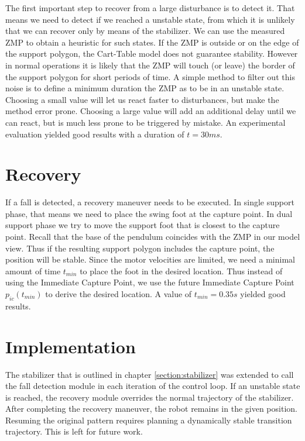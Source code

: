 \documentclass[english,ngerman]{KITreprt}
\begin{document}
The first important step to recover from a large disturbance is to
detect it. That means we need to detect if we reached a unstable state,
from which it is unlikely that we can recover only by means of the
stabilizer. We can use the measured ZMP to obtain a heuristic for such
states. If the ZMP is outside or on the edge of the support polygon, the
Cart-Table model does not guarantee stability. However in normal
operations it is likely that the ZMP will touch (or leave) the border of
the support polygon for short periods of time. A simple method to filter
out this noise is to define a minimum duration the ZMP as to be in an
unstable state. Choosing a small value will let us react faster to
disturbances, but make the method error prone. Choosing a large value
will add an additional delay until we can react, but is much less prone
to be triggered by mistake. An experimental evaluation yielded good
results with a duration of $t = 30ms$.

\section{Recovery}\label{recovery}

If a fall is detected, a recovery maneuver needs to be executed. In
single support phase, that means we need to place the swing foot at the
capture point. In dual support phase we try to move the support foot
that is closest to the capture point. Recall that the base of the
pendulum coincides with the ZMP in our model view. Thus if the resulting
support polygon includes the capture point, the position will be stable.
Since the motor velocities are limited, we need a minimal amount of time
$t_{min}$ to place the foot in the desired location. Thus instead of
using the Immediate Capture Point, we use the future Immediate Capture
Point $p_{ic}(t_{min})$ to derive the desired location. A value of
$t_{min} = 0.35s$ yielded good results.

\section{Implementation}\label{implementation-2}

The stabilizer that is outlined in chapter \ref{section:stabilizer} was
extended to call the fall detection module in each iteration of the
control loop. If an unstable state is reached, the recovery module
overrides the normal trajectory of the stabilizer. After completing the
recovery maneuver, the robot remains in the given position. Resuming the
original pattern requires planning a dynamically stable transition
trajectory. This is left for future work.
\end{document}
